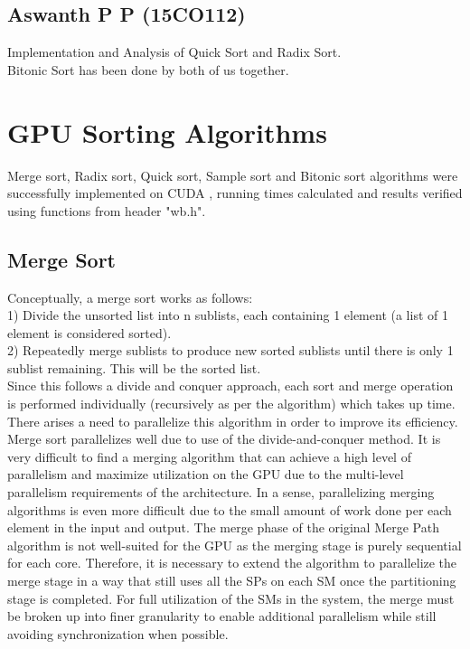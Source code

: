 \documentclass[conference]{IEEEtran}
\begin{document}
\subsection{Aswanth P P (15CO112)}
Implementation and Analysis of Quick Sort and Radix Sort.\\
Bitonic Sort has been done by both of us together. 

\section{GPU Sorting Algorithms}
Merge sort, Radix sort, Quick sort, Sample sort and Bitonic sort algorithms were successfully implemented on CUDA , running times calculated and results verified using functions from header "wb.h".

\subsection{Merge Sort}
Conceptually, a merge sort works as follows:   \\1) Divide the unsorted list into n sublists, each containing 1 element (a list of 1 element is considered sorted).\\
   2) Repeatedly merge sublists to produce new sorted sublists until there is only 1 sublist remaining. This will be the sorted list.\\
   
   Since this follows a divide and conquer approach, each sort and merge operation is performed individually (recursively as per the algorithm)
 which takes up time. There arises a need to parallelize this algorithm in order to improve its efficiency. Merge sort parallelizes well due to use of the divide-and-conquer method. It is very difficult to find a merging algorithm that can achieve
a high level of parallelism and maximize utilization on the GPU due to the multi-level parallelism requirements of the
architecture. In a sense, parallelizing merging algorithms is
even more difficult due to the small amount of work done
per each element in the input and output. The merge phase
of the original Merge Path algorithm is not well-suited for
the GPU as the merging stage is purely sequential for each
core. Therefore, it is necessary to extend the algorithm to
parallelize the merge stage in a way that still uses all the
SPs on each SM once the partitioning stage is completed. For full utilization of the SMs in the system, the merge
must be broken up into finer granularity to enable additional
parallelism while still avoiding synchronization when possible. \\
\end{document}
